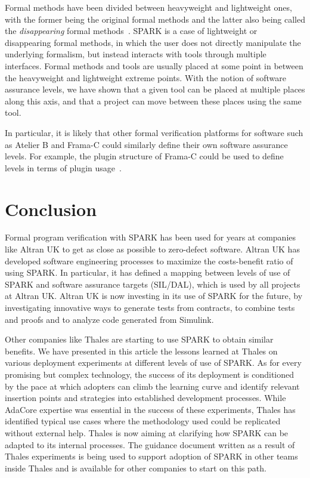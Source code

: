 \documentclass{llncs}
\begin{document}
Formal methods have been divided between heavyweight and lightweight ones, with
the former being the original formal methods and the latter also being called
the \textit{disappearing} formal methods~\cite{hase00}. SPARK is a case of
lightweight or disappearing formal methods, in which the user does not directly
manipulate the underlying formalism, but instead interacts with tools through
multiple interfaces. Formal methods and tools are usually placed at some point
in between the heavyweight and lightweight extreme points. With the notion of
software assurance levels, we have shown that a given tool can be placed at
multiple places along this axis, and that a project can move between these
places using the same tool.

In particular, it is likely that other formal verification platforms for
software such as Atelier B and Frama-C could similarly define their own
software assurance levels. For example, the plugin structure of Frama-C could
be used to define levels in terms of plugin usage~\cite{Kirchner2015}.

\section{Conclusion}
\label{sec:conclusion}

Formal program verification with SPARK has been used for years at companies
like Altran UK to get as close as possible to zero-defect software. Altran UK
has developed software engineering processes to maximize the costs-benefit
ratio of using SPARK. In particular, it has defined a mapping between levels of
use of SPARK and software assurance targets (SIL/DAL), which is used by all
projects at Altran UK. Altran UK is now investing in its use of SPARK for the
future, by investigating innovative ways to generate tests from contracts, to
combine tests and proofs and to analyze code generated from Simulink.

Other companies like Thales are starting to use SPARK to obtain similar
benefits. We have presented in this article the lessons learned at Thales on
various deployment experiments at different levels of use of SPARK. As for
every promising but complex technology, the success of its deployment is
conditioned by the pace at which adopters can climb the learning curve and
identify relevant insertion points and strategies into established development
processes. While AdaCore expertise was essential in the success of these
experiments, Thales has identified typical use cases where the methodology used
could be replicated without external help. Thales is now aiming at clarifying
how SPARK can be adapted to its internal processes. The guidance document
written as a result of Thales experiments is being used to support adoption of
SPARK in other teams inside Thales and is available for other companies to
start on this path.
\end{document}
